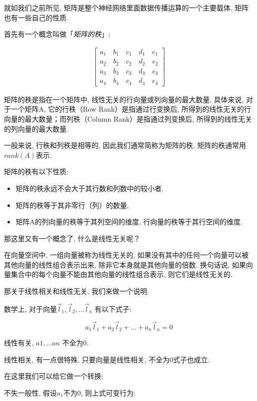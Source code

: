 就如我们之前所见, 矩阵是整个神经网络里面数据传播运算的一个主要载体. 矩阵也有一些自己的性质. 

首先有一个概念叫做「\textit{矩阵的秩}」: 

\begin{align*}
  \begin{bmatrix}
  a_1 \quad b_1 \quad c_1 \quad d_1 \quad e_1 \\
  a_2 \quad b_2 \quad c_2 \quad d_2 \quad e_2 \\
  a_3 \quad b_3 \quad c_3 \quad d_3 \quad e_3 \\
  a_4 \quad b_4 \quad c_4 \quad d_4 \quad e_4 
  \end{bmatrix}
\end{align*}

矩阵的秩是指在一个矩阵中, 线性无关的行向量或列向量的最大数量. 具体来说, 对于一个矩阵A, 它的行秩（Row Rank）是指通过行变换后, 所得到的线性无关的行向量的最大数量；而列秩（Column Rank）是指通过列变换后, 所得到的线性无关的列向量的最大数量. 

一般来说, 行秩和列秩是相等的, 因此我们通常简称为矩阵的秩. 矩阵的秩通常用$rank(A)$表示. 

矩阵的秩有以下性质: 

\begin{itemize}
  \item 矩阵的秩永远不会大于其行数和列数中的较小者. 
  \item 矩阵的秩等于其非零行（列）的数量. 
  \item 矩阵A的列向量的秩等于其列空间的维度, 行向量的秩等于其行空间的维度. 
\end{itemize}

那这里又有一个概念了, 什么是线性无关呢？

在向量空间中, 一组向量被称为线性无关的, 如果没有其中的任何一个向量可以被其他向量的线性组合表示出来, 除非它本身就是其他向量的倍数. 换句话说, 如果向量集合中的每个向量不能由其他向量的线性组合表示, 则它们是线性无关的. 

那关于线性相关和线性无关, 我们来做一个说明. 

数学上, 对于向量\(\vec l_1, \vec l_2, ... \vec l_n\) 有以下式子: 

\[a_1 \vec l_1 + a_2 \vec l_2 + ... + a_n \vec l_n = 0\]

线性有关, \(a1,...an\) 不全为0.

线性相关, 有一点很特殊, 只要向量是线性相关, 不全为0式子也成立. 

在这里我们可以给它做一个转换: 

不失一般性, 假设$a_1$不为0,  则上式可变行为: 


